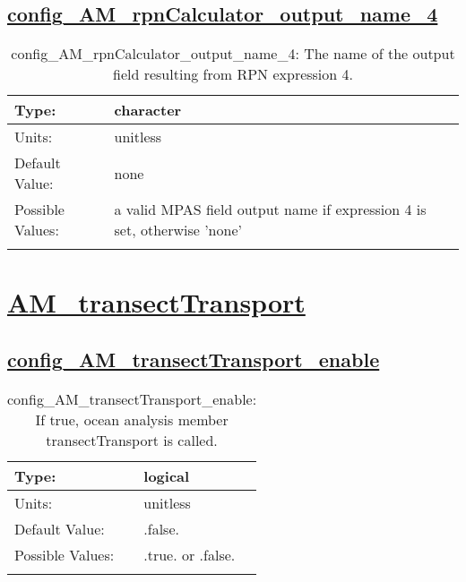 \subsection[config\_AM\_rpnCalculator\_output\_name\_4]{\hyperref[sec:nm_tab_AM_rpnCalculator]{config\_AM\_rpnCalculator\_output\_name\_4}}
\label{subsec:nm_sec_config_AM_rpnCalculator_output_name_4}
\begin{center}
\begin{longtable}{| p{2.0in} || p{4.0in} |}
    \hline
    Type: & character \\
    \hline
    Units: & \si{unitless} \\
    \hline
    Default Value: & none \\
    \hline
    Possible Values: & a valid MPAS field output name if expression 4 is set, otherwise 'none' \\
    \hline
    \caption{config\_AM\_rpnCalculator\_output\_name\_4: The name of the output field resulting from RPN expression 4.}
\end{longtable}
\end{center}
\section[AM\_transectTransport]{\hyperref[sec:nm_tab_AM_transectTransport]{AM\_transectTransport}}
\label{sec:nm_sec_AM_transectTransport}
\subsection[config\_AM\_transectTransport\_enable]{\hyperref[sec:nm_tab_AM_transectTransport]{config\_AM\_transectTransport\_enable}}
\label{subsec:nm_sec_config_AM_transectTransport_enable}
\begin{center}
\begin{longtable}{| p{2.0in} || p{4.0in} |}
    \hline
    Type: & logical \\
    \hline
    Units: & \si{unitless} \\
    \hline
    Default Value: & .false. \\
    \hline
    Possible Values: & .true. or .false. \\
    \hline
    \caption{config\_AM\_transectTransport\_enable: If true, ocean analysis member transectTransport is called.}
\end{longtable}
\end{center}
